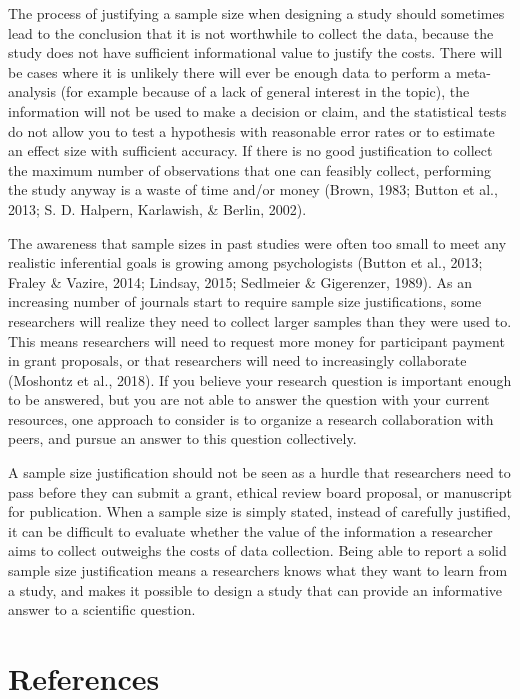 \documentclass[
  english,
  ,jou,floatsintext]{apa6}
\begin{document}
The process of justifying a sample size when designing a study should sometimes lead to the conclusion that it is not worthwhile to collect the data, because the study does not have sufficient informational value to justify the costs. There will be cases where it is unlikely there will ever be enough data to perform a meta-analysis (for example because of a lack of general interest in the topic), the information will not be used to make a decision or claim, and the statistical tests do not allow you to test a hypothesis with reasonable error rates or to estimate an effect size with sufficient accuracy. If there is no good justification to collect the maximum number of observations that one can feasibly collect, performing the study anyway is a waste of time and/or money (Brown, 1983; Button et al., 2013; S. D. Halpern, Karlawish, \& Berlin, 2002).

The awareness that sample sizes in past studies were often too small to meet any realistic inferential goals is growing among psychologists (Button et al., 2013; Fraley \& Vazire, 2014; Lindsay, 2015; Sedlmeier \& Gigerenzer, 1989). As an increasing number of journals start to require sample size justifications, some researchers will realize they need to collect larger samples than they were used to. This means researchers will need to request more money for participant payment in grant proposals, or that researchers will need to increasingly collaborate (Moshontz et al., 2018). If you believe your research question is important enough to be answered, but you are not able to answer the question with your current resources, one approach to consider is to organize a research collaboration with peers, and pursue an answer to this question collectively.

A sample size justification should not be seen as a hurdle that researchers need to pass before they can submit a grant, ethical review board proposal, or manuscript for publication. When a sample size is simply stated, instead of carefully justified, it can be difficult to evaluate whether the value of the information a researcher aims to collect outweighs the costs of data collection. Being able to report a solid sample size justification means a researchers knows what they want to learn from a study, and makes it possible to design a study that can provide an informative answer to a scientific question.

\hypertarget{references}{%
\section{References}\label{references}}
\end{document}
